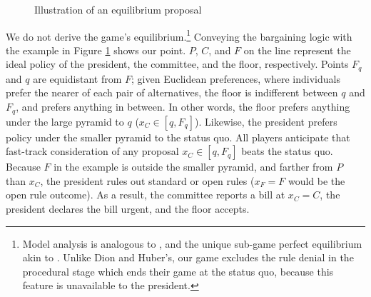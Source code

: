 \documentclass[letter,12pt]{article}
\begin{document}
\begin{figure}
  \centering
  \caption{Illustration of an equilibrium proposal}\label{F:example}
\end{figure}

We do not derive the game's equilibrium.\footnote{Model analysis is analogous to \citet{dion.huber.1996}, and the unique sub-game perfect equilibrium akin to \citet{magar.nd,romer.rosenthal.1978,cox.mccubbins.2005,gerber.1996}. Unlike Dion and Huber's, our game excludes the rule denial in the procedural stage which ends their game at the status quo, because this feature is unavailable to the president.} Conveying the bargaining logic with the example in Figure \ref{F:example} shows our point. $P$, $C$, and $F$ on the line represent the ideal policy of the president, the committee, and the floor, respectively. Points $F_q$ and $q$ are equidistant from $F$; given Euclidean preferences, where individuals prefer the nearer of each pair of alternatives, the floor is indifferent between $q$ and $F_q$, and prefers anything in between. In other words, the floor prefers anything under the large pyramid to $q$ ($x_C \in [q,F_q]$). Likewise, the president prefers policy under the smaller pyramid to the status quo. All players anticipate that fast-track consideration of any proposal $x_C \in [q,F_q]$ beats the status quo. Because $F$ in the example is outside the smaller pyramid, and farther from $P$ than $x_C$, the president rules out standard or open rules ($x_F=F$ would be the open rule outcome). As a result, the committee reports a bill at $x_C=C$, the president declares the bill urgent, and the floor accepts. 
\end{document}
